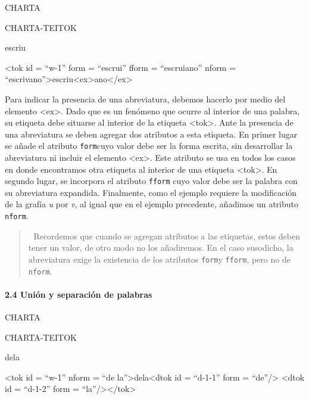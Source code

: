 \documentclass[
]{book}
\begin{document}
CHARTA

CHARTA-TEITOK

escriu

{\textless tok} {id} {=} {``w-1''} {form} {=} {``escrui''} {fform} {=} {``escruiano''} {nform} {=} {``escrivano''}{\textgreater{}}escriu{\textless ex\textgreater{}}ano{\textless/ex\textgreater{}}

Para indicar la presencia de una abreviatura, debemos hacerlo por medio del elemento { \textless ex\textgreater{}}. Dado que es un fenómeno que ocurre al interior de una palabra, su etiqueta debe situarse al interior de la etiqueta { \textless tok\textgreater{}}. Ante la presencia de una abreviatura se deben agregar dos atributos a esta etiqueta. En primer lugar se añade el atributo \texttt{form}cuyo valor debe ser la forma escrita, sin desarrollar la abreviatura ni incluir el elemento { \textless ex\textgreater{}}. Este atributo se usa en todos los casos en donde encontramos otra etiqueta al interior de una etiqueta { \textless tok\textgreater{}}. En segundo lugar, se incorpora el atributo \texttt{fform} cuyo valor debe ser la palabra con su abreviatura expandida. Finalmente, como el ejemplo requiere la modificación de la grafía \emph{u} por \emph{v}, al igual que en el ejemplo precedente, añadimos un atributo \texttt{nform}.

\begin{quote}
📝 Recordemos que cuando se agregan atributos a las etiquetas, estos deben tener un valor, de otro modo no los añadiremos. En el caso susodicho, la abreviatura exige la existencia de los atributos \texttt{form}y \texttt{fform}, pero no de \texttt{nform}.
\end{quote}

\hypertarget{uniuxf3n-y-separaciuxf3n-de-palabras}{%
\paragraph*{2.4 Unión y separación de palabras}\label{uniuxf3n-y-separaciuxf3n-de-palabras}}

CHARTA

CHARTA-TEITOK

dela

{\textless tok} {id} {=} {``w-1''} {nform} {=} {``de la''}{\textgreater{}}dela{\textless dtok} {id} {=} {``d-1-1''} {form} {=} {``de''}{/\textgreater{}} {\textless dtok} {id} {=} {``d-1-2''} {form} {=} {``la''}{/\textgreater{}}{\textless/tok\textgreater{}}
\end{document}
